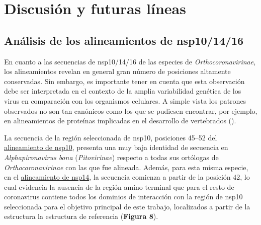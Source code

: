 \section{Discusión y futuras líneas}

\subsection{Análisis de los alineamientos de nsp10/14/16}

En cuanto a las secuencias de nsp10/14/16 de las especies de 
\textit{Orthocoronavirinae}, los alineamientos revelan en general gran 
número de posiciones altamente conservadas. Sin embargo, es importante tener
en cuenta que esta observación debe ser interpretada en el contexto de la 
amplia variabilidad genética de los virus en comparación con los organismos 
celulares. A simple vista los patrones observados no son tan canónicos como 
los que se pudiesen encontrar, por ejemplo, en alineamientos de proteínas 
implicadas en el desarrollo de vertebrados 
(\Cite{domingo_mutation_2021,duffy_why_2018,duffy_phylogenetic_2008,holmes_evolutionary_2009}).

La secuencia de la región seleccionada de nsp10, posiciones 45--52 del 
\href{https://htmlpreview.github.io/?https://github.com/villena-francis/bachelors_thesis/blob/main/data/align_no_ext_sp/nsp10/Trim_Alig_All_nsp10.html}{alineamiento de nsp10}, 
presenta una muy baja identidad de secuencia en 
\textit{Alphapironavirus bona} (\textit{Pitovirinae}) respecto a todas sus 
ortólogas de \textit{Orthocoronavirinae} con las que fue alineada. Además, 
para esta misma especie, en el 
\href{https://htmlpreview.github.io/?https://github.com/villena-francis/bachelors_thesis/blob/main/data/align_no_ext_sp/nsp14/Trim_Alig_All_nsp14.html}{alineamiento de nsp14}, 
la secuencia comienza a partir de la posición 42, lo cual evidencia la ausencia
de la región amino terminal que para el resto de coronavirus contiene todos 
los dominios de interacción con la región de nsp10 seleccionada para el 
objetivo principal de este trabajo, localizados a partir de la estructura la
estructura de referencia (\textbf{Figura 8}).


